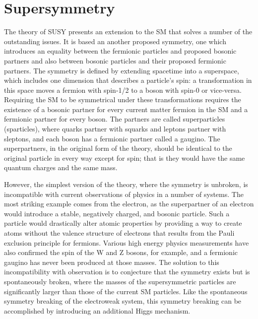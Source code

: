 \chapter{Supersymmetry}

\label{ch:supersymmetry}

The theory of \ac{SUSY} presents an extension to the \ac{SM} that solves a number of the outstanding issues. 
It is based an another proposed symmetry, one which introduces an equality between the fermionic particles and proposed bosonic partners and also between bosonic particles and their proposed fermionic partners.
The symmetry is defined by extending spacetime into a superspace, which includes one dimension that describes a particle's spin: a transformation in this space moves a fermion with spin-1/2 to a boson with spin-0 or vice-versa.
Requiring the \ac{SM} to be symmetrical under these transformations requires the existence of a bosonic partner for every current matter fermion in the \ac{SM} and a fermionic partner for every boson. 
The partners are called superparticles (sparticles), where quarks partner with squarks and leptons partner with sleptons, and each boson has a fermionic partner called a gaugino.
The superpartners, in the original form of the theory, should be identical to the original particle in every way except for spin; that is they would have the same quantum charges and the same mass.

However, the simplest version of the theory, where the symmetry is unbroken, is incompatible with current observations of physics in a number of systems.
The most striking example comes from the electron, as the superpartner of an electron would introduce a stable, negatively charged, and bosonic particle. 
Such a particle would drastically alter atomic properties by providing a way to create atoms without the valence structure of electrons that results from the Pauli exclusion principle for fermions.
Various high energy physics measurements have also confirmed the spin of the W and Z bosons, for example, and a fermionic gaugino has never been produced at those masses.
The solution to this incompatibility with observation is to conjecture that the symmetry exists but is spontaneously broken, where the masses of the supersymmetric particles are significantly larger than those of the current \ac{SM} particles.
Like the spontaneous symmetry breaking of the electroweak system, this symmetry breaking can be accomplished by introducing an additional Higgs mechanism.


